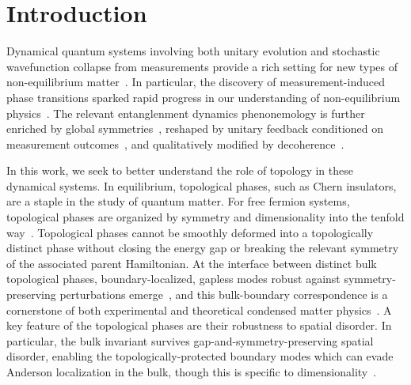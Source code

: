 
\section{Introduction}

Dynamical quantum systems involving both unitary evolution and stochastic wavefunction collapse from measurements provide a rich setting for new types of non-equilibrium matter~\cite{PotterVasseur2022,FisherKhemaniNahumVijay2023}.
In particular, the discovery of measurement-induced phase
transitions sparked rapid progress in our understanding of non-equilibrium physics~\cite{LiChenFisher2018,SkinnerRuhmanNahum2019,ChanNandkishorePretkoSmith2019,LiChenFisher2019,GullansHuse2020}. The relevant entanglenment dynamics phenonemology is further enriched by global symmetries~\cite{SangHsieh2021,BaoChoiAltman2021,LavasaniAlaviradBarkeshli2021,AgrawalEtAl2022,MajidyEtAl2023}, reshaped by unitary feedback conditioned on measurement outcomes~\cite{IadecolaEtAl2023,RavindranathEtAl2023,PiroliEtAl2023,SierantTurkeshi2023,ODeaEtAl2024}, and qualitatively modified by decoherence~\cite{WeinsteinBaoAltman2022,LiClaassen2023,LiSangHsieh2023,LiuLiZhangJian2024,IvakiOjanenMoghaddam2025}.

In this work, we seek to better understand the role of topology in these dynamical systems. In equilibrium, topological phases, such as Chern insulators, are a staple in
the study of quantum matter. For free fermion systems, topological phases are organized by symmetry and dimensionality into the tenfold way~\cite{AltlandZirnbauer1997,SchnyderRyuFurusakiLudwig2008,Kitaev2009,RyuSchnyderFurusakiLudwig2010,ChiuTeoSchnyderRyu2016}.
Topological phases cannot be smoothly deformed into a topologically distinct phase without closing the energy gap or breaking the relevant symmetry of the associated parent Hamiltonian. At the interface between distinct bulk topological phases, boundary-localized, gapless modes robust against symmetry-preserving
perturbations emerge~\cite{Halperin1982,Hatsugai1993,TeoKane2010}, and this bulk-boundary correspondence is a cornerstone of both experimental and theoretical condensed matter physics~\cite{HasanKane2010,QiZhang2011}. A key feature of the topological phases are their robustness to spatial disorder. In particular, the bulk invariant survives gap-and-symmetry-preserving spatial disorder, enabling the topologically-protected boundary modes which can
evade Anderson localization in the bulk, though this is specific to dimensionality~\cite{Halperin1982,EversMirlin2008}.

